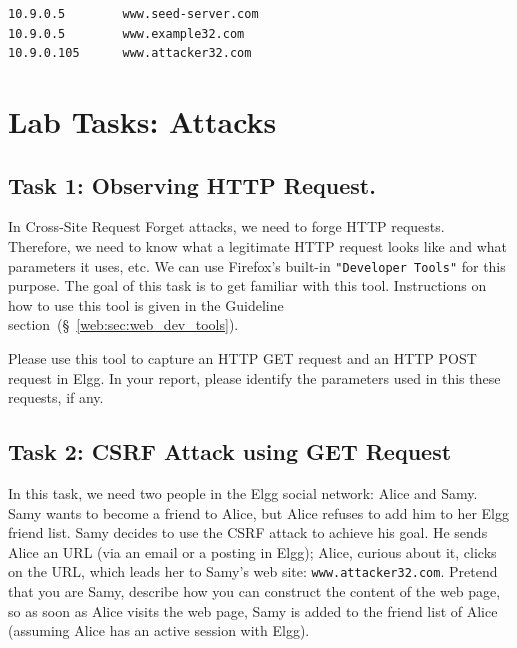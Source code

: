\begin{lstlisting}
10.9.0.5        www.seed-server.com
10.9.0.5        www.example32.com
10.9.0.105      www.attacker32.com
\end{lstlisting}


\vspace{-0.1in}



\vspace{-0.1in}



\section{Lab Tasks: Attacks}


\subsection{Task 1: Observing HTTP Request.}

In Cross-Site Request Forget attacks, we need to forge HTTP requests. 
Therefore, we need to know what a legitimate HTTP request looks like and 
what parameters it uses, etc. 
We can use Firefox's built-in \texttt{"Developer Tools"} for this purpose.
The goal of this task is to get familiar with this tool. 
Instructions on how to use this tool is given in the Guideline
section~(\S~\ref{web:sec:web_dev_tools}).

Please use this tool to capture an HTTP GET request and an HTTP POST
request in Elgg. In your report, please identify the parameters
used in this these requests, if any. 

\subsection{Task 2: CSRF Attack using GET Request}

In this task, we need two people in the Elgg social network: Alice
and Samy. Samy wants to become a friend to Alice, but Alice refuses to add 
him to her Elgg friend list. Samy decides to use the CSRF attack to
achieve his goal. He sends Alice an URL (via an email or a posting in 
Elgg); Alice, curious about it, clicks on the URL, which leads her to Samy's web site:    
\texttt{www.attacker32.com}. Pretend that you are Samy, describe how you
can construct the content of the web page, so as soon as Alice visits the
web page, Samy is added to the friend list of Alice (assuming Alice has an
active session with Elgg).


